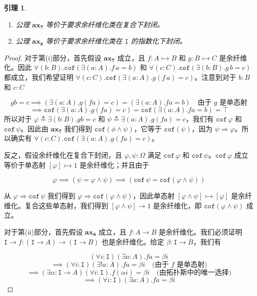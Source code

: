 \documentclass{ctexart}
\theoremstyle{plain}
\newtheorem{lemma}[theorem]{引理}
\theoremstyle{definition}
\theoremstyle{definition}
\theoremstyle{definition}
\theoremstyle{definition}
\newcommand\ttI{\mathtt{I}}
\newcommand{\ax}[1]{\mathbf{ax_{#1}}}
\numberwithin{equation}{section}
\begin{document}
\begin{lemma}
\begin{enumerate}[label=(\roman*)]
\item 公理 $\ax{7}$ 等价于要求余纤维化类在复合下封闭。
\item 公理 $\ax{8}$ 等价于要求余纤维化类在 $\ttI$ 的指数化下封闭。
\end{enumerate}
\end{lemma}
\begin{proof}对于第(i)部分，首先假设 $\ax{7}$ 成立，且 $f : A \rightarrowtail B$ 和 $g : B \rightarrowtail C$ 是余纤维化。因此 $\forall(b : B). \mathtt{cof}(\exists(a : A). f\, a = b)$ 和 $\forall(c : C). \mathtt{cof}(\exists(b : B). g\, b = c)$ 都成立，我们希望证明 $\forall(c : C). \mathtt{cof}(\exists(a : A). g(f\, a) = c)$。注意到对于 $b : B$ 和 $c : C$

\[g b = c \implies (\exists(a : A). g(f a) = c) = (\exists(a : A). f a = b) \quad \text{由于 } g \text{ 是单态射}\]
\[\implies \mathtt{cof}(\exists(a : A). g(f a) = c) = \mathtt{cof}(\exists(a : A). f a = b) = \top\]
所以对于 $\varphi \triangleq \exists(b : B). g b = c$ 和 $\psi \triangleq \exists(a : A). g(f a) = c$，我们有 $\mathtt{cof} \, \varphi$ 和 $\mathtt{cof} \, \psi$。因此由 $\ax{7}$ 我们得到 $\mathtt{cof}(\phi \wedge \psi)$，它等于 $\mathtt{cof}(\psi)$，因为 $\psi \Rightarrow \varphi$。所以确实有 $\forall(c : C). \mathtt{cof}(\exists(a : A). g(f a) = c)$。

反之，假设余纤维化在复合下封闭，且 $\varphi, \psi : \Omega$ 满足 $\mathtt{cof} \, \varphi$ 和 $\mathtt{cof} \, \psi$。$\mathtt{cof} \, \varphi$ 成立等价于单态射 $[\varphi] \rightarrowtail 1$ 是余纤维化；并且由于

\[\varphi \implies (\psi = \varphi \wedge \psi) \implies (\mathtt{cof} \, \psi = \mathtt{cof}(\varphi \wedge \psi))\]

从 $\varphi \Rightarrow \mathtt{cof} \, \psi$ 我们得到 $\varphi \Rightarrow \mathtt{cof}(\varphi \wedge \psi)$，因此单态射 $[\varphi \wedge \psi] \rightarrowtail [\varphi]$ 是余纤维化。复合这些单态射，我们得到 $[\varphi \wedge \psi] \to 1$ 是余纤维化，即 $\mathtt{cof}(\varphi \wedge \psi)$ 成立。

对于第(ii)部分，首先假设 $\ax{8}$ 成立，且 $f : A \to B$ 是余纤维化。我们必须证明 $\ttI \to f : (\ttI \to A) \to (\ttI \to B)$ 也是余纤维化。给定 $\beta : \ttI \to B$，我们有

\[(\forall i : \ttI)(\exists a : A). f a = \beta i\]
\[\implies (\forall i : \ttI)(\exists! a : A). f a = \beta i \quad \text{(由于 } f \text{ 是单态射)}\]
\[\implies (\exists \alpha : \ttI \to A)(\forall i : \ttI). f(\alpha i) = \beta i \quad \text{(由拓扑斯中的唯一选择)}\]
\[\implies (\forall i : \ttI)(\exists a : A). f a = \beta i\]


\end{proof}
\end{document}
